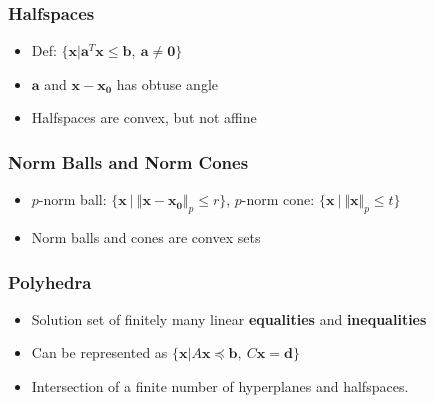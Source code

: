 \subsubsection*{Halfspaces}
\begin{itemize}
    \item Def: $\{\mathbf{x}|\mathbf{a}^T\mathbf{x} \leq \mathbf{b},~\mathbf{a}\neq\mathbf{0}\}$
    \item $\mathbf{a}$ and $\mathbf{x} - \mathbf{x_0}$ has obtuse angle
    \item Halfspaces are convex, but not affine
\end{itemize}

\subsubsection*{Norm Balls and Norm Cones}
\begin{itemize}
    \item $p$-norm ball: $\{\mathbf{x}~|~\Vert \mathbf{x} - \mathbf{x_0} \Vert_p \leq r\}$,
        $p$-norm cone: $\{\mathbf{x}~|~\Vert \mathbf{x} \Vert_p \leq t\}$
    \item Norm balls and cones are convex sets
\end{itemize}

\subsubsection*{Polyhedra}
\begin{itemize}
    \item Solution set of finitely many linear \textbf{equalities} and \textbf{inequalities}
    \item Can be represented as $\{\mathbf{x}|A\mathbf{x} \preceq \mathbf{b},~ C\mathbf{x} = \mathbf{d} \}$
    \item Intersection of a finite number of hyperplanes and halfspaces.
\end{itemize}

